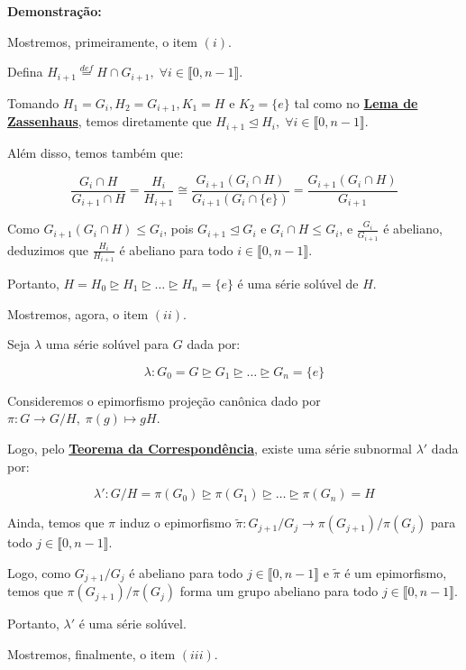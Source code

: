 \documentclass[16pt,openany]{book}
\theoremstyle{definition}
\begin{document}
{\color{red}

\textbf{Demonstração:}

Mostremos, primeiramente, o item $(i)$. 

Defina $H_{i+1} \overset{def}{=} H\cap G_{i+1}, \; \forall i\in \llbracket 0, n-1\rrbracket$.

Tomando $H_1 = G_i, H_2 = G_{i+1}, K_1 = H$ e $K_2 = \{e\}$ tal como no \hyperlink{zassenhaus}{\textbf{Lema de Zassenhaus}}, temos diretamente que $H_{i+1} \trianglelefteq H_i, \; \forall i\in \llbracket 0, n-1\rrbracket$.

Além disso, temos também que:

\[
\frac{G_i\cap H}{G_{i+1}\cap H} = \frac{H_i}{H_{i+1}} \cong \frac{G_{i+1}(G_i\cap H)}{G_{i+1}(G_i\cap \{e\})} = \frac{G_{i+1}(G_i\cap H)}{G_{i+1}}
\]

Como $G_{i+1}(G_i\cap H) \leq G_i$, pois $G_{i+1} \trianglelefteq G_i$ e $G_i\cap H \leq G_i$, e $\frac{G_i}{G_{i+1}}$ é abeliano, deduzimos que $\frac{H_i}{H_{i+1}}$ é abeliano para todo $i\in\llbracket 0, n-1\rrbracket$.

Portanto, $H = H_0 \trianglerighteq H_1 \trianglerighteq \ldots \trianglerighteq H_n = \{e\}$ é uma série solúvel de $H$. 

Mostremos, agora, o item $(ii)$.

Seja $\lambda$ uma série solúvel para $G$ dada por:

\[
\lambda: G_0 = G \trianglerighteq G_1 \trianglerighteq \ldots \trianglerighteq G_n = \{e\}
\]

Consideremos o epimorfismo projeção canônica dado por $\pi: G\to G/H,\; \pi(g)\mapsto gH$. 

Logo, pelo \hyperlink{correspondencia}{\textbf{Teorema da Correspondência}}, existe uma série subnormal $\lambda'$ dada por:

\[
\lambda': G/H = \pi(G_0) \trianglerighteq \pi(G_1) \trianglerighteq \ldots \trianglerighteq \pi(G_n) = H
\]

Ainda, temos que $\pi$ induz o epimorfismo $\tilde{\pi}: G_{j+1}/G_j \to \pi(G_{j+1})/\pi(G_j)$ para todo $j\in\llbracket 0, n-1\rrbracket$.

Logo, como $G_{j+1}/G_j$ é abeliano para todo $j\in\llbracket 0, n-1\rrbracket$ e $\tilde{\pi}$ é um epimorfismo, temos que $\pi(G_{j+1})/\pi(G_j)$ forma um grupo abeliano para todo $j\in\llbracket 0, n-1\rrbracket$. 

Portanto, $\lambda'$ é uma série solúvel.

Mostremos, finalmente, o item $(iii)$.

}
\end{document}
